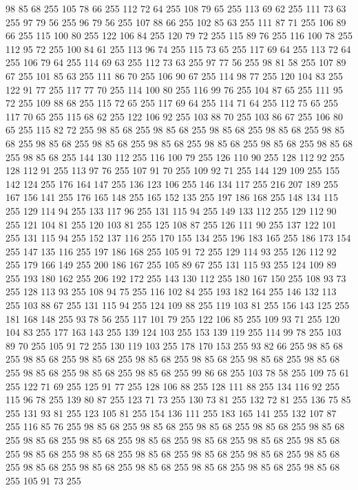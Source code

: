 98 85 68 255 105 78 66 255 112 72 64 255 108 79 65 255 113 69 62 255 111 73 63 255 97 79 56 255 96 79 56 255 107 88 66 255 102 85 63 255 111 87 71 255 106 89 66 255 115 100 80 255 122 106 84 255 120 79 72 255 115 89 76 255 116 100 78 255 112 95 72 255 100 84 61 255 113 96 74 255 115 73 65 255 117 69 64 255 113 72 64 255 106 79 64 255 114 69 63 255 112 73 63 255 97 77 56 255 98 81 58 255 107 89 67 255 101 85 63 255 111 86 70 255 106 90 67 255 114 98 77 255 120 104 83 255 122 91 77 255 117 77 70 255 114 100 80 255 116 99 76 255 104 87 65 255 111 95 72 255 109 88 68 255 115 72 65 255 117 69 64 255 114 71 64 255 112 75 65 255 117 70 65 255 115 68 62 255 122 106 92 255 103 88 70 255 103 86 67 255 106 80 65 255 115 82 72 255 98 85 68 255 98 85 68 255 98 85 68 255 98 85 68 255 98 85 68 255 98 85 68 255 98 85 68 255 98 85 68 255 98 85 68 255 98 85 68 255 98 85 68 255 98 85 68 255
144 130 112 255 116 100 79 255 126 110 90 255 128 112 92 255 128 112 91 255 113 97 76 255 107 91 70 255 109 92 71 255 144 129 109 255 155 142 124 255 176 164 147 255 136 123 106 255 146 134 117 255 216 207 189 255 167 156 141 255 176 165 148 255 165 152 135 255 197 186 168 255 148 134 115 255 129 114 94 255 133 117 96 255 131 115 94 255 149 133 112 255 129 112 90 255 121 104 81 255 120 103 81 255 125 108 87 255 126 111 90 255 137 122 101 255 131 115 94 255 152 137 116 255 170 155 134 255 196 183 165 255 186 173 154 255 147 135 116 255 197 186 168 255 105 91 72 255 129 114 93 255 126 112 92 255 179 166 149 255 200 186 167 255 105 89 67 255 131 115 93 255 124 109 89 255 193 180 162 255 206 192 172 255 143 130 112 255 180 167 150 255 108 93 73 255 128 113 93 255 108 94 75 255 116 102 84 255 193 182 164 255 146 132 113 255 103 88 67 255 131 115 94 255 124 109 88 255 119 103 81 255 156 143 125 255 181 168 148 255 93 78 56 255 117 101 79 255 122 106 85 255 109 93 71 255
120 104 83 255 177 163 143 255 139 124 103 255 153 139 119 255 114 99 78 255 103 89 70 255 105 91 72 255 130 119 103 255 178 170 153 255 93 82 66 255 98 85 68 255 98 85 68 255 98 85 68 255 98 85 68 255 98 85 68 255 98 85 68 255 98 85 68 255 98 85 68 255 98 85 68 255 98 85 68 255 99 86 68 255 103 78 58 255 109 75 61 255 122 71 69 255 125 91 77 255 128 106 88 255 128 111 88 255 134 116 92 255 115 96 78 255 139 80 87 255 123 71 73 255 130 73 81 255 132 72 81 255 136 75 85 255 131 93 81 255 123 105 81 255 154 136 111 255 183 165 141 255 132 107 87 255 116 85 76 255 98 85 68 255 98 85 68 255 98 85 68 255 98 85 68 255 98 85 68 255 98 85 68 255 98 85 68 255 98 85 68 255 98 85 68 255 98 85 68 255 98 85 68 255 98 85 68 255 98 85 68 255 98 85 68 255 98 85 68 255 98 85 68 255 98 85 68 255 98 85 68 255 98 85 68 255 98 85 68 255 98 85 68 255 98 85 68 255 98 85 68 255 105 91 73 255
